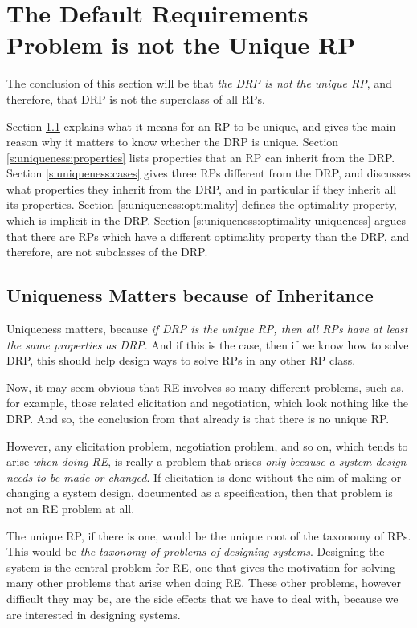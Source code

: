 \documentclass[graybox]{svmult}
\newcommand{\zi}[1]{\textit{#1}}
\newcommand{\RE}{RE}
\newcommand{\RPfull}{Requirements Problem}
\newcommand{\RP}{RP}
\newcommand{\ZJRPfull}{Default \RPfull}
\newcommand{\ZJRP}{DRP}
\begin{document}
%
\section{The \ZJRPfull{} is not the Unique \RP}\label{s:uniqueness}
The conclusion of this section will be that \zi{the \ZJRP{} is not the unique \RP}, and therefore, that \ZJRP{} is not the superclass of all \RP s. 

Section \ref{s:uniqueness:why} explains what it means for an \RP{} to be unique, and gives the main reason why it matters to know whether the \ZJRP{} is unique. Section \ref{s:uniqueness:properties} lists properties that an \RP{} can inherit from the \ZJRP. Section \ref{s:uniqueness:cases} gives three \RP s different from the \ZJRP, and discusses what properties they inherit from the \ZJRP, and in particular if they inherit all its properties. Section \ref{s:uniqueness:optimality} defines the optimality property, which is implicit in the \ZJRP. Section \ref{s:uniqueness:optimality-uniqueness} argues that there are \RP s which have a different optimality property than the \ZJRP, and therefore, are not subclasses of the \ZJRP.


%
\subsection{Uniqueness Matters because of Inheritance}\label{s:uniqueness:why}
Uniqueness matters, because \zi{if \ZJRP{} is the unique \RP, then all \RP s have at least the same properties as \ZJRP}. And if this is the case, then if we know how to solve \ZJRP, this should help design ways to solve \RP s in any other \RP{} class. 

Now, it may seem obvious that \RE{} involves so many different problems, such as, for example, those related elicitation and negotiation, which look nothing like the \ZJRP. And so, the conclusion from that already is that there is no unique \RP.

However, any elicitation problem, negotiation problem, and so on, which tends to arise \zi{when doing \RE}, is really a problem that arises \zi{only because a system design needs to be made or changed}. If elicitation is done without the aim of making or changing a system design, documented as a specification, then that problem is not an \RE{} problem at all.

The unique \RP, if there is one, would be the unique root of the taxonomy of \RP s. This would be \zi{the taxonomy of problems of designing systems}. Designing the system is the central problem for \RE, one that gives the motivation for solving many other problems that arise when doing \RE. These other problems, however difficult they may be, are the side effects that we have to deal with, because we are interested in designing systems.
\end{document}

